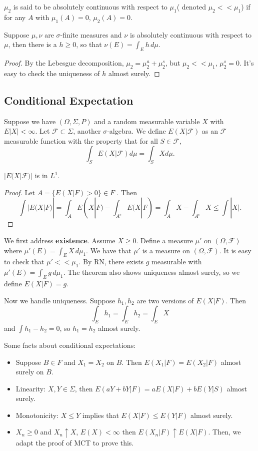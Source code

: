 \documentclass[11pt]{scrartcl}
\begin{document}
 \begin{definition} $\mu_2$ is said to be absolutely continuous with respect to $\mu_1$( denoted $\mu_2 << \mu_1$) if for any $A$ with $\mu_1(A) = 0$, $\mu_2(A) = 0$.
 \end{definition}
 
 \begin{thm} Suppose $\mu, \nu$ are $\sigma$-finite measures and $\nu$ is absolutely continuous with respect to $\mu$, then there is a $h \ge 0$, so that $\nu(E) = \int_E h\, d\mu$.
 \end{thm} 
\begin{proof}
By the Lebesgue decomposition, $\mu_2 = \mu_2^a + \mu_2^s$, but $\mu_2 << \mu_1$, $\mu_2^s = 0$.    It's easy to check the uniqueness of $h$ almost surely.
\end{proof}
\subsection{Conditional Expectation}
\begin{definition}  Suppose we have $(\Omega, \Sigma, P)$ and a random measurable variable $X$ with $E|X| < \infty$.  Let $\mathcal F \subset \Sigma$, another $\sigma$-algebra.  We define $E(X | \mathcal F)$ as an $\mathcal F$ measurable function with the property that for all $S \in \mathcal F$,
$$\int_S E(X | \mathcal F) d\mu = \int_S X d\mu.$$ 
\end{definition}
\begin{lemma} 
$|E(X|\mathcal F)|$ is in $L^1$.  
\end{lemma}
\begin{proof}
Let $A = \{E(X|F) > 0\} \in F$ .  Then
$$\int |E(X|F)| = \int_A E(X|F) - \int_{A^c} E(X|F) = \int_A X - \int_{A^c} X \le \int |X|.$$
\end{proof}

We first address \textbf{existence}.  Assume $X \ge 0$.  Define a measure $\mu'$ on $(\Omega, \mathcal F)$ where $\mu'(E) = \int_E X\, d\mu_1.$  We have that $\mu'$ is a measure on $(\Omega, \mathcal F)$.  It is easy to check that $\mu' << \mu_1$.  By RN, there exists $g$ measurable with $\mu'(E) = \int_E g\, d\mu_1$.  The theorem also shows uniqueness almost surely, so we define $E(X|F) = g$.

Now we handle uniqueness.  Suppose $h_1, h_2$ are two versions of $E(X|F)$.  Then
 $$\int_E h_1 = \int_E h_2 = \int_E X$$
 and $\int h_1 - h_2 = 0$, so $h_1 = h_2$ almost surely.

Some facts about conditional expectations:
\begin{itemize}
\item Suppose $B \in F$ and $X_1 = X_2$ on $B$.  Then $E(X_1|F) = E(X_2|F)$ almost surely on $B$.
\item Linearity: $X, Y \in \Sigma$, then $E(aY + bY | F) = aE(X|F) + bE(Y|S)$ almost surely.
\item Monotonicity: $X \le Y$ implies that $E(X|F) \le E(Y|F)$ almost surely.  
\item $X_n \ge 0$ and $X_n \uparrow X$, $E(X) < \infty$ then $E(X_n|F) \uparrow E(X|F)$.  Then, we adapt the proof of MCT to prove this.  
\end{itemize}
\pagebreak
\end{document}
